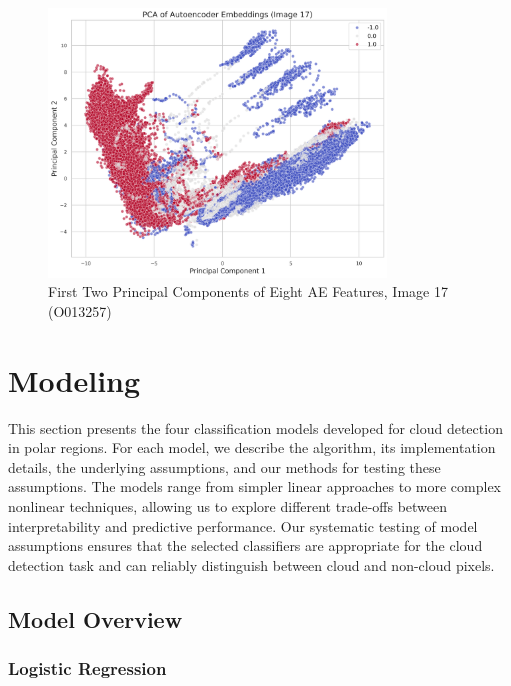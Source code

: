 \documentclass[10pt,letterpaper]{article}
\begin{document}
\begin{figure}[H]
    \centering
    \includegraphics[width=0.8\textwidth]{AE_features.png}
    \caption{First Two Principal Components of Eight AE Features, Image 17 (O013257)}
    \label{Figure 8}
\end{figure}















\section{Modeling}
 This section presents the four classification models developed for cloud detection in polar regions. For each model, we describe the algorithm, its implementation details, the underlying assumptions, and our methods for testing these assumptions. The models range from simpler linear approaches to more complex nonlinear techniques, allowing us to explore different trade-offs between interpretability and predictive performance. Our systematic testing of model assumptions ensures that the selected classifiers are appropriate for the cloud detection task and can reliably distinguish between cloud and non-cloud pixels.

 \subsection{Model Overview}
 
\subsubsection{Logistic Regression}
\end{document}
